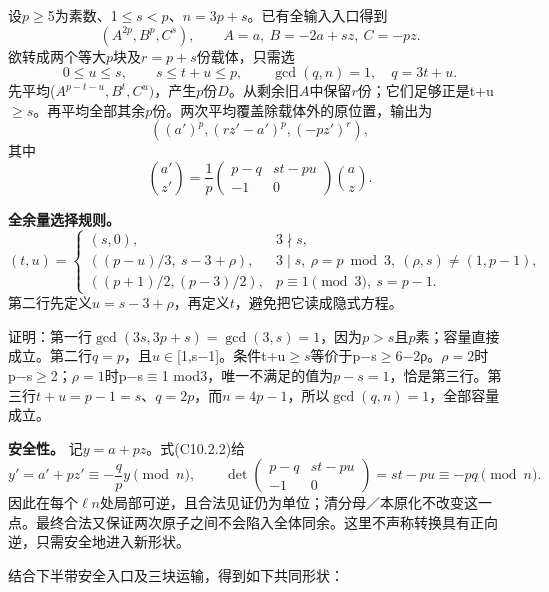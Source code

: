 {设\ensuremath{p}\ensuremath{\ge}5为素数、1\ensuremath{\le}\ensuremath{s<p}、\ensuremath{n=3p+s}。已有全输入入口得到} \[
(A^{2p},B^p,C^s),\qquad A=a,\ B=-2a+sz,\ C=-pz.
\] {欲转成两个等大\ensuremath{p}块及\ensuremath{r=p+s}份载体，只需选} \[
0\le u\le s,\qquad s\le t+u\le p,\qquad
\gcd(q,n)=1,\quad q=3t+u.
\tag{C10.2.1}
\] {先平均(\ensuremath{A^{p-t-u},B^{t},C^{u})}，产生\ensuremath{p}份\ensuremath{D}。从剩余旧\ensuremath{A}中保留\ensuremath{r}份；它们足够正是t+u\ensuremath{\ge}\ensuremath{s}。再平均全部其余\ensuremath{p}份。两次平均覆盖除载体外的原位置，输出为} \[
((a')^p,(rz'-a')^p,(-pz')^r),
\] {其中} \[
\binom{a'}{z'}=\frac1p
\begin{pmatrix}p-q&st-pu\\-1&0\end{pmatrix}\binom az.
\tag{C10.2.2}
\]

\textbf{{全余量选择规则。}} \[
(t,u)=
\begin{cases}
(s,0),&3\nmid s,\\
((p-u)/3,\ s-3+\rho),&3\mid s,\ \rho=p\bmod3,\ (\rho,s)\ne(1,p-1),\\
((p+1)/2,(p-3)/2),&p\equiv1\pmod3,\ s=p-1.
\end{cases}
\tag{C10.2.3}
\] {第二行先定义\ensuremath{u=s-3+\rho }，再定义\ensuremath{t}，避免把它读成隐式方程。}

{证明：第一行\ensuremath{\operatorname{gcd}(3s,3p+s)=\operatorname{gcd}(3,s)=1}，因为\ensuremath{p>s}且\ensuremath{p}素；容量直接成立。第二行\ensuremath{q=p}，且\ensuremath{u}\ensuremath{\in}{[}1,s−1{]}。条件t+u\ensuremath{\ge}\ensuremath{s}等价于p−s\ensuremath{\ge}6−2ρ。\ensuremath{\rho =2}时p−s\ensuremath{\ge}2；\ensuremath{\rho =1}时p−s\ensuremath{\equiv}1} {mod3，唯一不满足的值为\ensuremath{p-s=1}，恰是第三行。第三行\ensuremath{t+u=p-1=s}、\ensuremath{q=2p}，而\ensuremath{n=4p-1}，所以\ensuremath{\operatorname{gcd}(q,n)=1}，全部容量成立。}

\textbf{{安全性。}} {记\ensuremath{y=a+pz}。式(C10.2.2)给} \[
y'=a'+pz'\equiv-\frac qp y\pmod n,
\qquad
\det\begin{pmatrix}p-q&st-pu\\-1&0\end{pmatrix}
=st-pu\equiv-pq\pmod n.
\tag{C10.2.4}
\] {因此在每个\ensuremath{\ell}\textbar{}\ensuremath{n}处局部可逆，且合法见证仍为单位；清分母／本原化不改变这一点。最终合法又保证两次原子之间不会陷入全体同余。这里不声称转换具有正向逆，只需安全地进入新形状。}

{结合下半带安全入口及三块运输，得到如下共同形状：}

